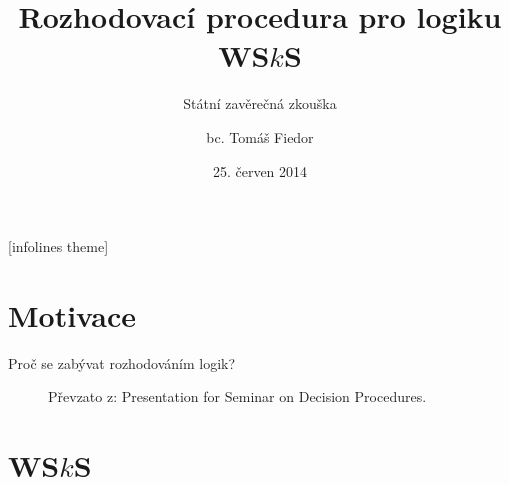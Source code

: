 \documentclass{beamer}
\title[Rozhodovací procedura pro logiku WS$k$S]{Rozhodovací procedura pro logiku
WS$k$S}
\subtitle{Státní zavěrečná zkouška}
\author[T. Fiedor]{bc. Tomáš Fiedor}
\date{25. červen 2014}
\institute[vedoucí: Lengál]{pod vedením Ing. Ondřeje Lengála}
\begin{document}
[infolines theme]

  \begin{frame}[plain]
    \titlepage
  \end{frame}
	
	\section{Motivace}
	\begin{frame}[t]{Proč se zabývat rozhodováním logik?}
  \begin{figure}
  \begin{center}
   \caption{Převzato z: Presentation for Seminar on Decision Procedures.}
   \end{center}
   \end{figure}
  \end{frame}	
	
	\section{WS$k$S}
\end{document}
